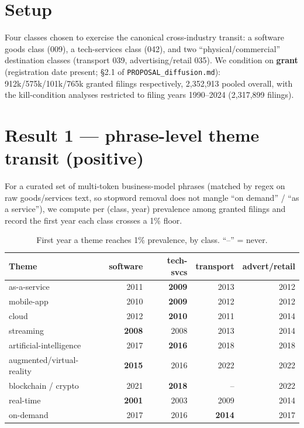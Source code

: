 \documentclass[11pt]{report}
\begin{document}
\section{Setup}
Four classes chosen to exercise the canonical cross-industry transit: a software
goods class (009), a tech-services class (042), and two ``physical/commercial''
destination classes (transport 039, advertising/retail 035). We condition on
\textbf{grant} (registration date present; §2.1 of \texttt{PROPOSAL\_diffusion.md}):
912k/575k/101k/765k granted filings respectively, 2{,}352{,}913 pooled overall,
with the kill-condition analyses restricted to filing years 1990--2024
(2{,}317{,}899 filings).

\section{Result 1 --- phrase-level theme transit (positive)}
For a curated set of multi-token business-model phrases (matched by regex on raw
goods/services text, so stopword removal does not mangle ``on demand'' /
``as a service''), we compute per (class, year) prevalence among granted filings
and record the first year each class crosses a 1\% floor.

\begin{table}[h]\centering\small
\caption{First year a theme reaches 1\% prevalence, by class. ``--'' = never.}
\begin{tabular}{lrrrr}
\toprule
Theme & software & tech-svcs & transport & advert/retail \\
\midrule
as-a-service           & 2011 & \textbf{2009} & 2013 & 2012 \\
mobile-app             & 2010 & \textbf{2009} & 2012 & 2012 \\
cloud                  & 2012 & \textbf{2010} & 2011 & 2014 \\
streaming              & \textbf{2008} & 2008 & 2013 & 2014 \\
artificial-intelligence& 2017 & \textbf{2016} & 2018 & 2018 \\
augmented/virtual-reality & \textbf{2015} & 2016 & 2022 & 2022 \\
blockchain / crypto    & 2021 & \textbf{2018} & --   & 2022 \\
real-time              & \textbf{2001} & 2003 & 2009 & 2014 \\
on-demand              & 2017 & 2016 & \textbf{2014} & 2017 \\
\bottomrule
\end{tabular}
\end{table}
\end{document}
